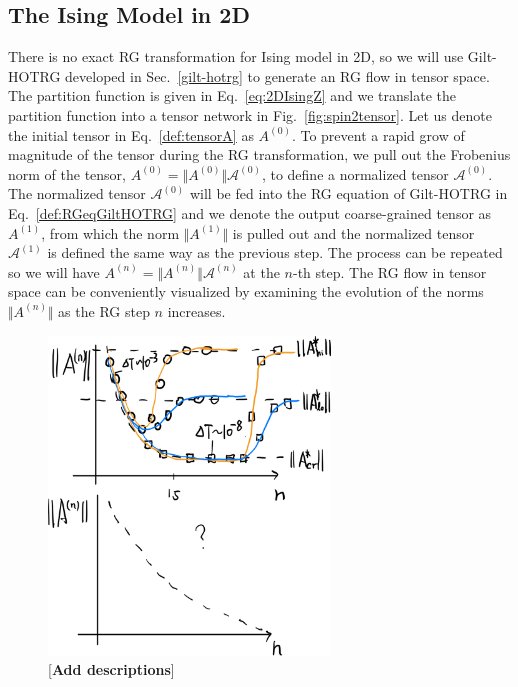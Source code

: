 \documentclass[aps,prb,reprint,superscriptaddress]{revtex4-2}
\begin{document}
\subsection{The Ising Model in 2D\label{benchmark:2DIsing}}
There is no exact RG transformation for Ising model in 2D, so we will
use Gilt-HOTRG developed in Sec.~\ref{gilt-hotrg} to generate an RG flow
in tensor space. The partition function is given in
Eq.~\eqref{eq:2DIsingZ} and we translate the partition function into
a tensor network in Fig.~\ref{fig:spin2tensor}. Let us denote the
initial tensor in Eq.~\eqref{def:tensorA} as $A^{(0)}$. To prevent a
rapid grow of magnitude of the tensor during the RG transformation, we
pull out the Frobenius norm of the tensor, $A^{(0)} = \Vert
A^{(0)}\Vert \mathcal{A}^{(0)}$, to define a normalized tensor
$\mathcal{A}^{(0)}$. The normalized tensor $\mathcal{A}^{(0)}$ will be
fed into the RG equation of Gilt-HOTRG in Eq.~\eqref{def:RGeqGiltHOTRG}
and we denote the output coarse-grained tensor as $A^{(1)}$, from which
the norm $\Vert A^{(1)}\Vert$ is pulled out and the normalized tensor
$\mathcal{A}^{(1)}$ is defined the same way as the previous step. The
process can be repeated so we will have $A^{(n)} = \Vert A^{(n)}\Vert
\mathcal{A}^{(n)}$ at the $n$-th step. The RG flow in tensor space can
be conveniently visualized by examining the evolution of the norms
$\Vert A^{(n)}\Vert$ as the RG step $n$ increases.
\begin{figure}[htb]
    \includegraphics[width=7.5cm]{./figs/flowAnorm}
    \caption{\label{fig:flowAnorm}[\textbf{Add descriptions}]}
\end{figure}
%
\end{document}
